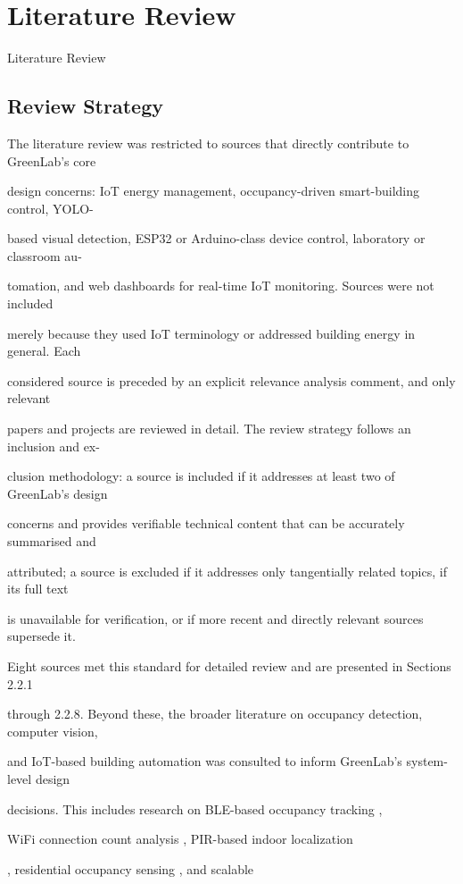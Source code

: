 \chapter{Literature Review}
Literature Review


\section{Review Strategy}
The literature review was restricted to sources that directly contribute to GreenLab's core

design concerns: IoT energy management, occupancy-driven smart-building control, YOLO-

based visual detection, ESP32 or Arduino-class device control, laboratory or classroom au-

tomation, and web dashboards for real-time IoT monitoring. Sources were not included

merely because they used IoT terminology or addressed building energy in general. Each

considered source is preceded by an explicit relevance analysis comment, and only relevant

papers and projects are reviewed in detail. The review strategy follows an inclusion and ex-

clusion methodology: a source is included if it addresses at least two of GreenLab's design

concerns and provides veriﬁable technical content that can be accurately summarised and

attributed; a source is excluded if it addresses only tangentially related topics, if its full text

is unavailable for veriﬁcation, or if more recent and directly relevant sources supersede it.

Eight sources met this standard for detailed review and are presented in Sections 2.2.1

through 2.2.8. Beyond these, the broader literature on occupancy detection, computer vision,

and IoT-based building automation was consulted to inform GreenLab's system-level design

decisions. This includes research on BLE-based occupancy tracking \cite{tekler2020,park2018},

WiFi connection count analysis \cite{alishahi2021}, PIR-based indoor localization

\cite{mukhopadhyay2021}, residential occupancy sensing \cite{mitra2022}, and scalable

